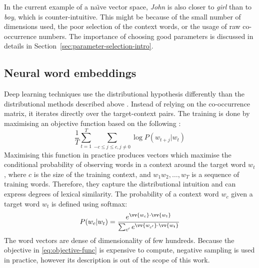 In the current example of a na{\"\i}ve vector space, \textit{John} is also closer to \textit{girl} than to \textit{boy}, which is counter-intuitive. This might be because of the small number of dimensions used, the poor selection of the context words, or the usage of raw co-occurrence numbers. The importance of choosing good parameters is discussed in details in Section~\ref{sec:parameter-selection-intro}.

\subsection{Neural word embeddings}
\label{sec:neural-embedding}

Deep learning techniques use the distributional hypothesis differently than the distributional methods described above \cite{Goldberg2016}. Instead of relying on the co-occurrence matrix, it iterates directly over the target-context pairs. The training is done by maximising an objective function based on the following \cite{mikolov2013linguistic,mikolov2013distributed,mikolov2013distributed}:
%
\begin{equation}
 \frac{1}{T}\sum^{T}_{t=1}\sum_{-c \leq j \leq c, j\neq0} \log P(w_{t+j}|w_t)
  \label{eq:objective-func}
\end{equation}
%
Maximising this function in practice produces vectors which maximise the conditional probability of observing words in a context around the target word $w_t$, where $c$ is the size of the training context, and $w_1 w_2, \ldots, w_T$ is a sequence of training words. Therefore, they capture the distributional intuition and can express degrees of lexical similarity. The probability of a context word $w_c$ given a target word $w_t$ is defined using softmax:
%
\begin{equation*}
  P(w_c|w_{t}) = \frac{e^{\vv{w_c} \cdot \vv{w_t}}}{\sum_{c'}e^{\vv{w_{c'}} \cdot \vv{w_t}}}
\end{equation*}
%
The word vectors are dense of dimensionality of few hundreds. Because the objective in \eqref{eq:objective-func} is expensive to compute, negative sampling is used in practice, however its description is out of the scope of this work.



